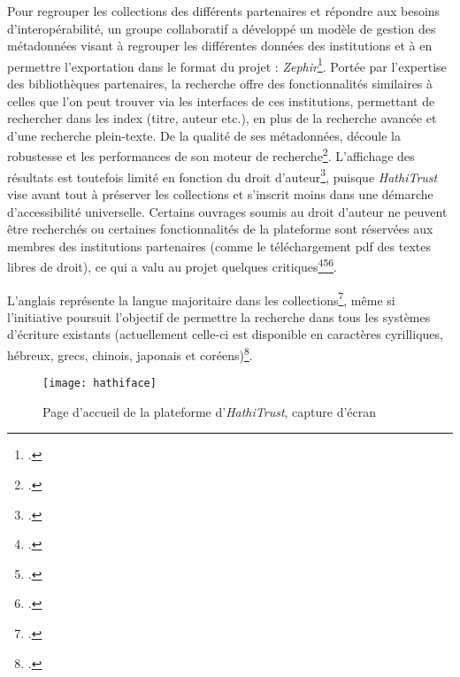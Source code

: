 Pour regrouper les collections des différents partenaires et répondre aux besoins d'interopérabilité, un groupe collaboratif a développé un modèle de gestion des métadonnées visant à regrouper les différentes données des institutions et à en permettre l'exportation dans le format du projet : \textit{Zephir}\footcite{hathitrust_digital_library_zephir_nodate}. Portée par l'expertise des bibliothèques partenaires, la recherche offre des fonctionnalités similaires à celles que l'on peut trouver via les interfaces de ces institutions, permettant de rechercher dans les index (titre, auteur etc.), en plus de la recherche avancée et d'une recherche plein-texte. De la qualité de ses métadonnées, découle la robustesse et les performances de son moteur de recherche\footcite{weiss_using_2014}. L'affichage des résultats est toutefois limité en fonction du droit d'auteur\footcite{lau-suchet_hathitrust_2014}, puisque \textit{HathiTrust} vise avant tout à préserver les collections et s'inscrit moins dans une démarche d'accessibilité universelle. Certains ouvrages soumis au droit d'auteur ne peuvent être recherchés ou certaines fonctionnalités de la plateforme sont réservées aux membres des institutions partenaires (comme le téléchargement pdf des textes libres de droit), ce qui a valu au projet quelques critiques\footcite{wu_building_2011}\footcite{obrien_large-scale_2015}\footcite{xie_discover_2016}. 

L'anglais représente la langue majoritaire dans les collections\footcite{weiss_using_2014}, même si l'initiative poursuit l'objectif de permettre la recherche dans tous les systèmes d'écriture existants (actuellement celle-ci est disponible en caractères cyrilliques, hébreux, grecs, chinois, japonais et coréens)\footcite{lau-suchet_hathitrust_2014}.
\newpage
\begin{figure}[H]%
\centering
\texttt{[image: hathiface]}
\caption{Page d'accueil de la plateforme d'\textit{HathiTrust}, capture d'écran}
\end{figure}


